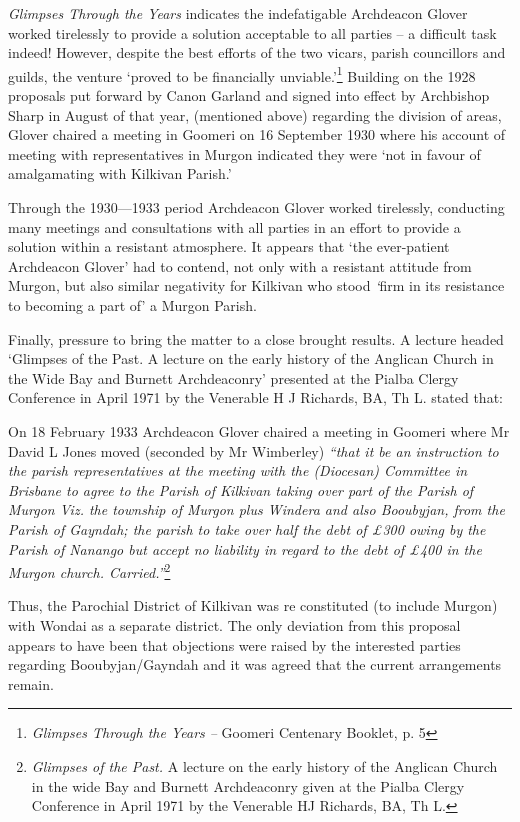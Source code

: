 \emph{Glimpses Through the Years} indicates the indefatigable Archdeacon Glover worked tirelessly to provide a solution acceptable to all parties -- a difficult task indeed! However, despite the best efforts of the two vicars, parish councillors and guilds, the venture `proved to be financially unviable.'\footnote{\emph{Glimpses Through the Years --} Goomeri Centenary Booklet, p. 5} Building on the 1928 proposals put forward by Canon Garland and signed into effect by Archbishop Sharp in August of that year, (mentioned above) regarding the division of areas, Glover chaired a meeting in Goomeri on 16 September 1930 where his account of meeting with representatives in Murgon indicated they were `not in favour of amalgamating with Kilkivan Parish.'

Through the 1930---1933 period Archdeacon Glover worked tirelessly, conducting many meetings and consultations with all parties in an effort to provide a solution within a resistant atmosphere. It appears that `the ever-patient Archdeacon Glover' had to contend, not only with a resistant attitude from Murgon, but also similar negativity for Kilkivan who stood \emph{`}firm in its resistance to becoming a part of' a Murgon Parish.

Finally, pressure to bring the matter to a close brought results. A lecture headed `Glimpses of the Past. A lecture on the early history of the Anglican Church in the Wide Bay and Burnett Archdeaconry' presented at the Pialba Clergy Conference in April 1971 by the Venerable H J Richards, BA, Th L. stated that:

On 18 February 1933 Archdeacon Glover chaired a meeting in Goomeri where Mr David L Jones moved (seconded by Mr Wimberley) \emph{``that it be an instruction to the parish representatives at the meeting with the (Diocesan) Committee in Brisbane to agree to the Parish of Kilkivan taking over part of the Parish of Murgon Viz. the township of Murgon plus Windera and also Booubyjan, from the Parish of Gayndah; the parish to take over half the debt of £300 owing by the Parish of Nanango but accept no liability in regard to the debt of £400 in the Murgon church. Carried.''}\footnote{\emph{Glimpses of the Past.} A lecture on the early history of the Anglican Church in the wide Bay and Burnett Archdeaconry given at the Pialba Clergy Conference in April 1971 by the Venerable HJ Richards, BA, Th L.}

Thus, the Parochial District of Kilkivan was re constituted (to include Murgon) with Wondai as a separate district. The only deviation from this proposal appears to have been that objections were raised by the interested parties regarding Booubyjan/Gayndah and it was agreed that the current arrangements remain.

